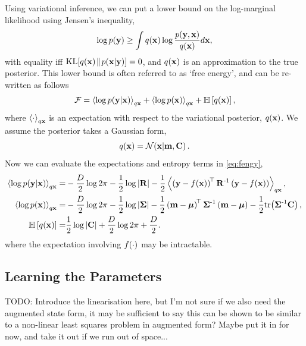 \documentclass{article} %
\begin{document}
Using variational inference, we can put a lower bound on the log-marginal
likelihood using Jensen's inequality, 
\begin{equation}
    \log p\!\left({\mathbf{y}}\right) \geq \int q\!\left({\mathbf{x}}\right) \log 
        \frac{p\!\left({\mathbf{y}, \mathbf{x}}\right)}{q\!\left({\mathbf{x}}\right)} d\mathbf{x},
\end{equation}
with equality iff $\text{KL}\!\left[{{q\!\left({\mathbf{x}}\right)}\!\parallel\!{p\!\left({\mathbf{x}}\middle\vert{\ensuremath{\mathbf{y}}}\right)}}\right] = 0$, and
$q\!\left({\mathbf{x}}\right)$ is an approximation to the true posterior. This lower bound is
often referred to as `free energy', and can be re-written as follows
\begin{equation}
    \mathcal{F} = \left\langle{\log \ensuremath{p\!\left({\mathbf{y}}\middle\vert{\ensuremath{\mathbf{x}}}\right)}}\right\rangle_{q\mathbf{x}}
        + \left\langle{\log \ensuremath{p\!\left({\mathbf{x}}\right)}}\right\rangle_{q\mathbf{x}} + \mathbb{H}\left[{q\!\left({\mathbf{x}}\right)}\right],
    \label{eq:fengy}
\end{equation}
where $\left\langle{\cdot}\right\rangle_{q\mathbf{x}}$ is an expectation with respect to the
variational posterior, $q\!\left({\mathbf{x}}\right)$. We assume the posterior takes a
Gaussian form,
\begin{equation}
    q\!\left({\mathbf{x}}\right) = \mathcal{N}\!\left({\mathbf{x}}\middle\vert{\ensuremath{\mathbf{m}}, \ensuremath{\mathbf{C}}}\right). \label{eq:varpost}
\end{equation}
Now we can evaluate the expectations and entropy terms in \eqref{eq:fengy},
\begin{align}
    \expec{q\lstate}{\log \probC{\obs}{\lstate}}
        =& - \frac{D}{2}\log{2\pi} - \frac{1}{2} \log\deter{\lcov} 
        - \frac{1}{2} 
            \expec{q\lstate}{\brac{\obs - \nonlin{\lstate}}\transpose\lcov\inv
            \brac{\obs - \nonlin{\lstate}}},
            \label{eq:qlike} \\
    \expec{q\lstate}{\log \prob{\lstate}}
        =& - \frac{D}{2}\log{2\pi} - \frac{1}{2}\log\deter{\prcov}
            - \frac{1}{2} \brac{\pomean - \prmean}\transpose\prcov\inv
            \brac{\pomean - \prmean}
            - \frac{1}{2} \trace{\prcov\inv\pocov},
            \label{eq:qprior} \\
    \entropy{\qrob{\lstate}} =& \frac{1}{2} \log\deter{\pocov} 
        + \frac{D}{2}\log{2\pi} + \frac{D}{2} \label{eq:qentropy}.
\end{align}
where the expectation involving $f\!\left({{\cdot}}\right)$ may be intractable.


\subsection{Learning the Parameters}

TODO: Introduce the linearisation here, but I'm not sure if we also need the
augmented state form, it may be sufficient to say this can be shown to be
similar to a non-linear least squares problem in augmented form? Maybe put it
in for now, and take it out if we run out of space...
\end{document}

